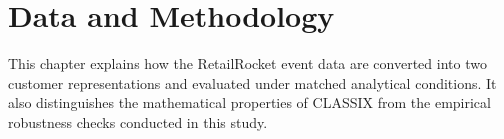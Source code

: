 \chapter{Data and Methodology}
\label{ch:methodology}

This chapter explains how the RetailRocket event data are converted into two customer representations and evaluated under matched analytical conditions. It also distinguishes the mathematical properties of CLASSIX from the empirical robustness checks conducted in this study.



